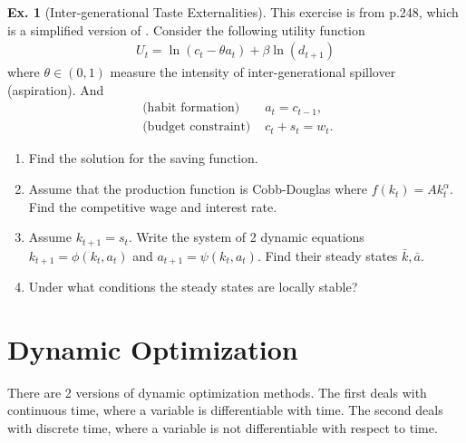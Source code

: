 \documentclass[11pt,a4paper]{book}
\theoremstyle{definition}\newtheorem{definition}{Definition}
\theoremstyle{definition}\newtheorem{fact}{Fact}
\theoremstyle{definition}\newtheorem{remark}{Remark}
\theoremstyle{definition}\newtheorem{ex}{Ex.}
\theoremstyle{definition}\newtheorem{project}{Project}
\theoremstyle{definition}\newtheorem{problem}{Problem}
\theoremstyle{definition}\newtheorem{example}{Example}
\numberwithin{theorem}{section}
\numberwithin{corollary}{chapter}
\numberwithin{assumption}{chapter}
\numberwithin{definition}{chapter}
\numberwithin{prop}{chapter}
\numberwithin{notation}{chapter}
\numberwithin{problem}{chapter}
\numberwithin{example}{chapter}
\numberwithin{fact}{chapter}
\numberwithin{ex}{chapter}
\begin{document}
	\begin{ex}[Inter-generational Taste Externalities]
		\label{ex:dynamic} This exercise is from \citet{de2002theory} p.248, which is a simplified version of \citet{de1996dynamics}. Consider the following utility function
		\begin{align*}
			U_t = \ln(c_t - \theta a_t ) + \beta \ln(d_{t+1})
		\end{align*}
		where $\theta \in (0,1)$ measure the intensity of inter-generational spillover (aspiration). And
		\begin{align*}
			\text{ (habit formation) } & a_t = c_{t-1}, \\
			\text{ (budget constraint) } & c_t + s_t = w_t.
		\end{align*}
		\begin{enumerate}
			\item Find the solution for the saving function.
			\item Assume that the production function is Cobb-Douglas where $f(k_t) = A k_t^\alpha$. Find the competitive wage and interest rate.
			\item Assume $k_{t+1} = s_t$. Write the system of 2 dynamic equations $k_{t+1} = \phi (k_t, a_t)$ and $a_{t+1} = \psi (k_t, a_t)$. Find their steady states $\bar{k}, \bar{a}$.
			\item Under what conditions the steady states are locally stable?
		\end{enumerate}
	\end{ex}
		
	
	\chapter{Dynamic Optimization}
	There are 2 versions of dynamic optimization methods. The first deals with continuous time, where a variable is differentiable with time. The second deals with discrete time, where a variable is not differentiable with respect to time.
	
\end{document}
